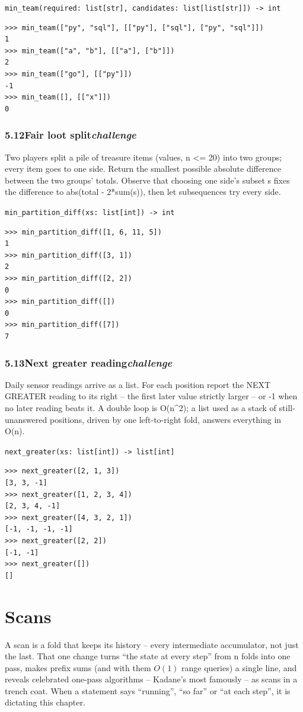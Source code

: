 \documentclass[10pt,letterpaper]{book}
\begin{document}
\noindent\texttt{min\_team(required: list[str], candidates: list[list[str]]) -> int}
\begin{lstlisting}[style=ex]
>>> min_team(["py", "sql"], [["py"], ["sql"], ["py", "sql"]])
1
>>> min_team(["a", "b"], [["a"], ["b"]])
2
>>> min_team(["go"], [["py"]])
-1
>>> min_team([], [["x"]])
0
\end{lstlisting}
\subsection*{5.12\quad Fair loot split\hfill\textnormal{\textit{challenge}}}
Two players split a pile of treasure items (values, n <= 20) into two groups; every item goes to one side. Return the smallest possible absolute difference between the two groups' totals. Observe that choosing one side's subset s fixes the difference to abs(total - 2*sum(s)), then let subsequences try every side.

\noindent\texttt{min\_partition\_diff(xs: list[int]) -> int}
\begin{lstlisting}[style=ex]
>>> min_partition_diff([1, 6, 11, 5])
1
>>> min_partition_diff([3, 1])
2
>>> min_partition_diff([2, 2])
0
>>> min_partition_diff([])
0
>>> min_partition_diff([7])
7
\end{lstlisting}
\subsection*{5.13\quad Next greater reading\hfill\textnormal{\textit{challenge}}}
Daily sensor readings arrive as a list. For each position report the NEXT GREATER reading to its right -- the first later value strictly larger -- or -1 when no later reading beats it. A double loop is O(n\^{}2); a list used as a stack of still-unanswered positions, driven by one left-to-right fold, answers everything in O(n).

\noindent\texttt{next\_greater(xs: list[int]) -> list[int]}
\begin{lstlisting}[style=ex]
>>> next_greater([2, 1, 3])
[3, 3, -1]
>>> next_greater([1, 2, 3, 4])
[2, 3, 4, -1]
>>> next_greater([4, 3, 2, 1])
[-1, -1, -1, -1]
>>> next_greater([2, 2])
[-1, -1]
>>> next_greater([])
[]
\end{lstlisting}
\clearpage
\chapter{Scans}

A scan is a fold that keeps its history -- every intermediate accumulator,
not just the last. That one change turns ``the state at every step'' from n
folds into one pass, makes prefix sums (and with them $O(1)$ range queries)
a single line, and reveals celebrated one-pass algorithms -- Kadane's most
famously -- as scans in a trench coat. When a statement says ``running'',
``so far'' or ``at each step'', it is dictating this chapter.
\end{document}
